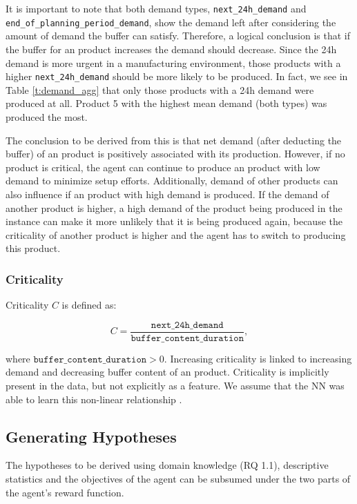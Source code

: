 It is important to note that both demand types, \texttt{next\_24h\_demand} and \texttt{end\_of\_planning\_period\_demand}, show the demand left after considering the amount of demand the buffer can satisfy. Therefore, a logical conclusion is that if the buffer for an product increases the demand should decrease.
Since the 24h demand is more urgent in a manufacturing environment, those products with a higher \texttt{next\_24h\_demand} should be more likely to be produced. In fact, we see in Table \ref{t:demand_agg} that only those products with a 24h demand were produced at all. Product 5 with the highest mean demand (both types) was produced the most.

The conclusion to be derived from this is that net demand (after deducting the buffer) of an product is positively associated with its production. However, if no product is critical, the agent can continue to produce an product with low demand to minimize setup efforts. Additionally, demand of other products can also influence if an product with high demand is produced. If the demand of another product is higher, a high demand of the product being produced in the instance can make it more unlikely that it is being produced again, because the criticality of another product is higher and the agent has to switch to producing this product.

\subsubsection{Criticality}
\label{criticality_chapter}
Criticality \( C \) is defined as:

\[
    C = \frac{\texttt{next\_24h\_demand}}{\texttt{buffer\_content\_duration}},\]

where \(\texttt{buffer\_content\_duration} > 0\). Increasing criticality is linked to increasing demand and decreasing buffer content of an product. Criticality is implicitly present in the data, but not explicitly as a feature. We assume that the NN was able to learn this non-linear relationship .

\subsection{Generating Hypotheses}
The hypotheses to be derived using domain knowledge (RQ 1.1), descriptive statistics and the objectives of the agent can be subsumed under the two parts of the agent's reward function.


